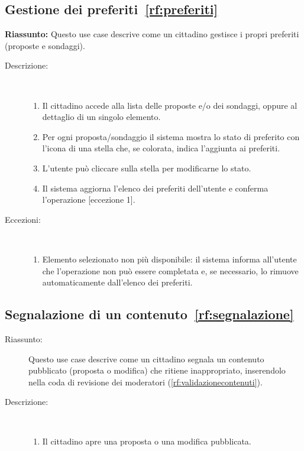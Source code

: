 \begin{ucscope}
\subsection{Gestione dei preferiti~\ref{rf:preferiti}}

\textbf{Riassunto:} Questo use case descrive come un cittadino gestisce i propri preferiti (proposte e sondaggi).

\begin{description}
  \item[Descrizione:]~
  \begin{enumerate}
    \item Il cittadino accede alla lista delle proposte e/o dei sondaggi, oppure al dettaglio di un singolo elemento.

    \item Per ogni proposta/sondaggio il sistema mostra lo stato di preferito con l'icona di una stella che, se colorata, indica l'aggiunta ai preferiti.

    \item L'utente può cliccare sulla stella per modificarne lo stato.

    \item Il sistema aggiorna l’elenco dei preferiti dell’utente e conferma l’operazione [eccezione 1].
  \end{enumerate}

  \item[Eccezioni:]~
  \begin{enumerate}
    \item Elemento selezionato non più disponibile: il sistema informa all’utente che l’operazione non può essere completata e, se necessario, lo rimuove automaticamente dall’elenco dei preferiti.
  \end{enumerate}
\end{description}

\subsection{Segnalazione di un contenuto~\ref{rf:segnalazione}}

\begin{description}
	\item[Riassunto:]
	Questo use case descrive come un cittadino segnala un contenuto pubblicato (proposta o modifica) che ritiene inappropriato, inserendolo nella coda di revisione dei moderatori (\ref{rf:validazionecontenuti}).

	\item[Descrizione:]~
	\begin{enumerate}
		\item Il cittadino apre una proposta o una modifica pubblicata.


\end{enumerate}
\end{description}
\end{ucscope}
